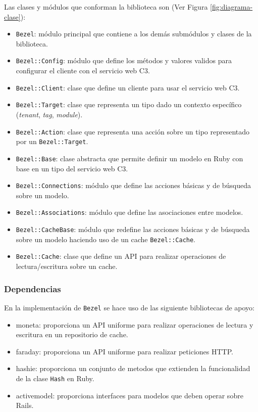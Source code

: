 Las clases y módulos que conforman la biblioteca son
(Ver Figura \ref{fig:diagrama-clase}):
\begin{itemize}
\item \texttt{Bezel}: módulo principal que contiene a los demás submódulos y
  clases de la biblioteca.
\item \texttt{Bezel::Config}: módulo que define los métodos y valores validos
  para configurar el cliente con el servicio web C3.
\item \texttt{Bezel::Client}: clase que define un cliente para usar el servicio
  web C3.
\item \texttt{Bezel::Target}: clase que representa un tipo dado un contexto
  específico (\textit{tenant}, \textit{tag}, \textit{module}).
\item \texttt{Bezel::Action}: clase que representa una acción sobre
  un tipo representado por un \texttt{Bezel::Target}.
\item \texttt{Bezel::Base}: clase abstracta que permite definir un modelo en Ruby
  con base en un tipo del servicio web C3.
\item \texttt{Bezel::Connections}: módulo que define las acciones básicas y de
  búsqueda sobre un modelo.
\item \texttt{Bezel::Associations}: módulo que define las asociaciones entre
  modelos.
\item \texttt{Bezel::CacheBase}: módulo que redefine las acciones básicas y
  de búsqueda sobre un modelo haciendo uso de un cache \texttt{Bezel::Cache}.
\item \texttt{Bezel::Cache}: clase que define un API para realizar operaciones
  de lectura/escritura sobre un cache.
\end{itemize}


\subsubsection{Dependencias}

En la implementación de \texttt{Bezel} se hace uso de las siguiente bibliotecas
de apoyo:

\begin{itemize}
\item moneta: proporciona un API uniforme para realizar
  operaciones de lectura y escritura en un repositorio de cache.
\item faraday: proporciona un API uniforme para realizar
  peticiones HTTP.
\item hashie: proporciona un conjunto de metodos que extienden la funcionalidad
  de la clase \texttt{Hash} en Ruby.
\item activemodel: proporciona interfaces para modelos que deben operar sobre
  Rails.
\end{itemize}

